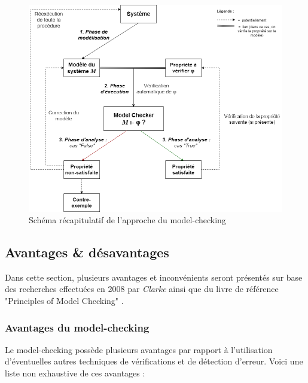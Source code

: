 \documentclass[runningheads,a4paper,10pt]{llncs}
\begin{document}
\begin{figure}
  \centering
   \includegraphics[scale=0.45]{figures/Diag_Recap_MC.png}
   \caption[Caption for LOF]{Schéma récapitulatif de l'approche du model-checking}
   \label{fig:schematic-view}
\end{figure}

\subsection{Avantages \& désavantages}

Dans cette section, plusieurs avantages et inconvénients seront présentés sur base des recherches effectuées en 2008 par \textit{Clarke} \cite{Birth-MC} ainsi que du livre de référence "Principles of Model Checking" \cite{RefBook}.

\subsubsection{Avantages du model-checking} \label{sec:avantages}

Le model-checking possède plusieurs avantages par rapport à l'utilisation d'éventuelles autres techniques de vérifications et de détection d'erreur. Voici une liste non exhaustive de ces avantages : 
\end{document}
